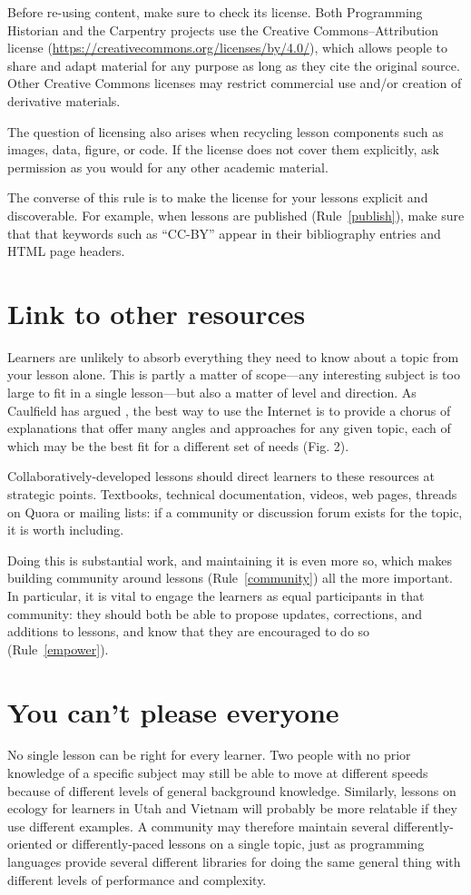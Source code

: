 \documentclass[10pt,letterpaper]{article}
\newcommand{\rulemajor}[2]{\section{#1}\label{#2}}
\newcommand{\ruleref}[1]{Rule~\ref{#1}}
\begin{document}
Before re-using content,
make sure to check its license.
Both Programming Historian and the Carpentry projects
use the Creative Commons--Attribution license
(\url{https://creativecommons.org/licenses/by/4.0/}),
which allows people to share and adapt material for any purpose
as long as they cite the original source.
Other Creative Commons licenses may restrict commercial use
and/or creation of derivative materials.

The question of licensing also arises when recycling lesson components
such as images, data, figure, or code.
If the license does not cover them explicitly,
ask permission as you would for any other academic material.

The converse of this rule is to make the license for your lessons explicit and discoverable.
For example,
when lessons are published (\ruleref{publish}),
make sure that that keywords such as ``CC-BY'' appear in their bibliography entries
and HTML page headers.

\rulemajor{Link to other resources}{link}

Learners are unlikely to absorb everything they need to know about a topic from your lesson alone.
This is partly a matter of scope---any interesting subject is too large
to fit in a single lesson---but also a matter of level and direction.
As Caulfield has argued \cite{choral-explanations},
the best way to use the Internet is to provide a chorus of explanations
that offer many angles and approaches for any given topic,
each of which may be the best fit for a different set of needs (Fig. 2).

Collaboratively-developed lessons should direct learners to these resources at strategic points.
Textbooks,
technical documentation,
videos,
web pages,
threads on Quora or mailing lists:
if a community or discussion forum exists for the topic,
it is worth including.

Doing this is substantial work,
and maintaining it is even more so,
which makes building community around lessons (\ruleref{community}) all the more important.
In particular,
it is vital to engage the learners as equal participants in that community:
they should both be able to propose updates, corrections, and additions to lessons,
and know that they are encouraged to do so (\ruleref{empower}).

\rulemajor{You can't please everyone}{everyone}

No single lesson can be right for every learner.
Two people with no prior knowledge of a specific subject
may still be able to move at different speeds
because of different levels of general background knowledge.
Similarly,
lessons on ecology for learners in Utah and Vietnam
will probably be more relatable if they use different examples.
A community may therefore maintain several differently-oriented or differently-paced lessons
on a single topic,
just as programming languages provide several different libraries for doing the same general thing
with different levels of performance and complexity.
\end{document}
